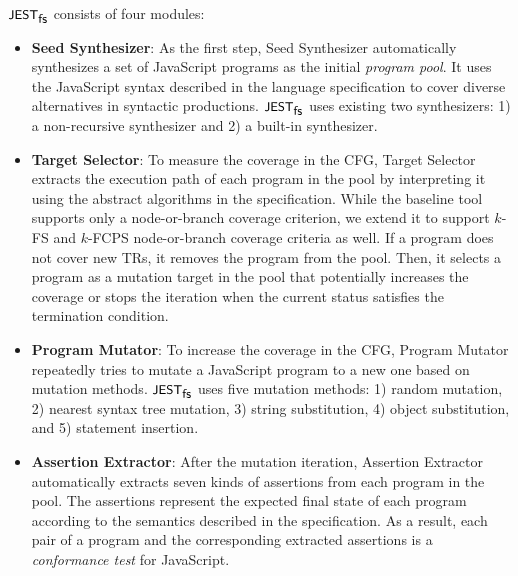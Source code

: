 

$\textsf{\small JEST}_{\textsf{\small fs}}$ consists of four modules:
\begin{itemize}
  \item \textsf{\textbf{Seed Synthesizer}}:
    As the first step, \textsf{Seed Synthesizer} automatically synthesizes a set
    of JavaScript programs as the initial \textit{program pool}.
    It uses the JavaScript syntax described in the language specification to
    cover diverse alternatives in syntactic productions.
    $\textsf{\small JEST}_{\textsf{\small fs}}$ uses existing two synthesizers: 1) a non-recursive synthesizer and
    2) a built-in synthesizer.
  \item \textsf{\textbf{Target Selector}}:
    To measure the coverage in the CFG, \textsf{Target Selector} extracts the
    execution path of each program in the pool by interpreting it using the
    abstract algorithms in the specification.
    While the baseline tool supports only a node-or-branch coverage criterion,
    we extend it to support $k$-FS and $k$-FCPS node-or-branch coverage
    criteria as well.
    If a program does not cover new TRs, it removes the program from the pool.
    Then, it selects a program as a mutation target in the pool that potentially
    increases the coverage or stops the iteration when the current status
    satisfies the termination condition.
  \item \textsf{\textbf{Program Mutator}}:
    To increase the coverage in the CFG, \textsf{Program Mutator} repeatedly
    tries to mutate a JavaScript program to a new one based on mutation methods.
    $\textsf{\small JEST}_{\textsf{\small fs}}$ uses five mutation methods: 1) random mutation, 2)
    nearest syntax tree mutation, 3) string substitution, 4) object
    substitution, and 5) statement insertion.
  \item \textsf{\textbf{Assertion Extractor}}:
    After the mutation iteration, \textsf{Assertion Extractor} automatically
    extracts seven kinds of assertions from each program in the pool.
    The assertions represent the expected final state of each program according
    to the semantics described in the specification.
    As a result, each pair of a program and the corresponding extracted
    assertions is a \textit{conformance test} for JavaScript.
\end{itemize}


